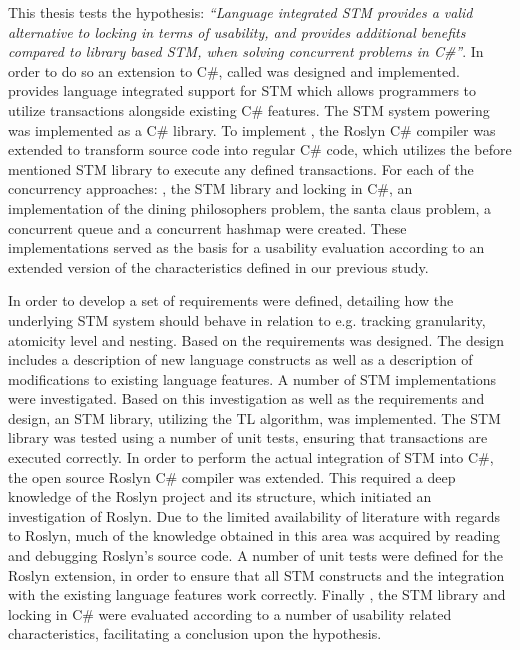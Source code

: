 \makeatletter {}\makeatother
{}

This thesis tests the hypothesis: \textit{``Language integrated \ac{STM} provides a valid alternative to locking in terms of usability, and provides additional benefits compared to library based \ac{STM}, when solving concurrent problems in C\#''}. In order to do so an extension to C\#, called \stmname was designed and implemented. \stmname provides language integrated support for \ac{STM} which allows programmers to utilize transactions alongside existing C\# features. The \ac{STM} system powering \stmname was implemented as a C\# library. To implement \stmname, the Roslyn C\# compiler was extended to transform \stmname source code into regular C\# code, which utilizes the before mentioned \ac{STM} library to execute any defined transactions. For each of the concurrency approaches: \stmname, the \ac{STM} library and locking in C\#, an implementation of the dining philosophers problem, the santa claus problem, a concurrent queue and a concurrent hashmap were created. These implementations served as the basis for a usability evaluation according to an extended version of the characteristics defined in our previous study\cite{dpt907e14trending}. 

In order to develop \stmname a set of requirements were defined, detailing how the underlying \ac{STM} system should behave in relation to e.g. tracking granularity, atomicity level and nesting. Based on the requirements \stmname was designed. The design includes a description of new language constructs as well as a description of modifications to existing language features. A number of \ac{STM} implementations were investigated. Based on this investigation as well as the requirements and design, an \ac{STM} library, utilizing the TL algorithm, was implemented. The \ac{STM} library was tested using a number of unit tests, ensuring that transactions are executed correctly. In order to perform the actual integration of \ac{STM} into C\#, the open source Roslyn C\# compiler was extended. This required a deep knowledge of the Roslyn project and its structure, which initiated an investigation of Roslyn. Due to the limited availability of literature with regards to Roslyn, much of the knowledge obtained in this area was acquired by reading and debugging Roslyn's source code. A number of unit tests were defined for the Roslyn extension, in order to ensure that all \ac{STM} constructs and the integration with the existing language features work correctly. Finally \stmname, the \ac{STM} library and locking in C\# were evaluated according to a number of usability related characteristics, facilitating a conclusion upon the hypothesis.

